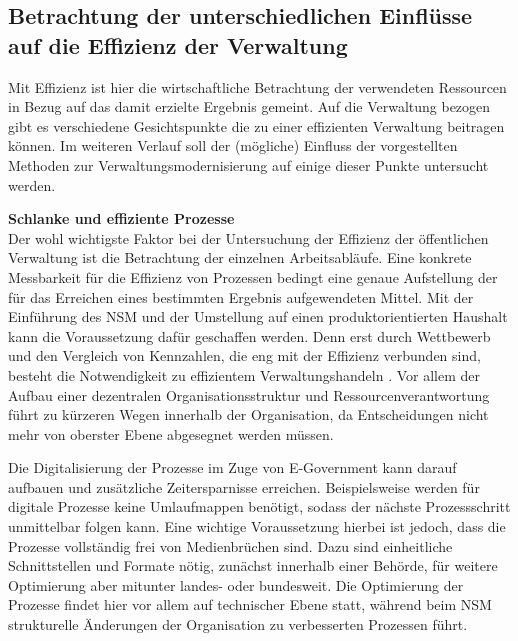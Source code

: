 \subsection{Betrachtung der unterschiedlichen Einflüsse auf die Effizienz der Verwaltung}
Mit Effizienz ist hier die wirtschaftliche Betrachtung der verwendeten Ressourcen in Bezug auf das damit erzielte Ergebnis gemeint.
Auf die Verwaltung bezogen gibt es verschiedene Gesichtspunkte die zu einer effizienten Verwaltung beitragen können.
Im weiteren Verlauf soll der (mögliche) Einfluss der vorgestellten Methoden zur Verwaltungsmodernisierung auf einige dieser Punkte untersucht werden.

\textbf{Schlanke und effiziente Prozesse}\\
Der wohl wichtigste Faktor bei der Untersuchung der Effizienz der öffentlichen Verwaltung ist die Betrachtung der einzelnen Arbeitsabläufe.
Eine konkrete Messbarkeit für die Effizienz von Prozessen bedingt eine genaue Aufstellung der für das Erreichen eines bestimmten Ergebnis aufgewendeten Mittel.
Mit der Einführung des NSM und der Umstellung auf einen produktorientierten Haushalt kann die Voraussetzung dafür geschaffen werden.
Denn erst durch Wettbewerb und den Vergleich von Kennzahlen, die eng mit der Effizienz verbunden sind, besteht die Notwendigkeit zu effizientem Verwaltungshandeln \cite[][]{Jann2019}.
Vor allem der Aufbau einer dezentralen Organisationsstruktur und Ressourcenverantwortung führt zu kürzeren Wegen innerhalb der Organisation, da Entscheidungen nicht mehr von oberster Ebene abgesegnet werden müssen.

Die Digitalisierung der Prozesse im Zuge von E-Government kann darauf aufbauen und zusätzliche Zeitersparnisse erreichen.
Beispielsweise werden für digitale Prozesse keine Umlaufmappen benötigt, sodass der nächste Prozessschritt unmittelbar folgen kann.
Eine wichtige Voraussetzung hierbei ist jedoch, dass die Prozesse vollständig frei von Medienbrüchen sind.
Dazu sind einheitliche Schnittstellen und Formate nötig, zunächst innerhalb einer Behörde, für weitere Optimierung aber mitunter landes- oder bundesweit.
Die Optimierung der Prozesse findet hier vor allem auf technischer Ebene statt, während beim NSM strukturelle Änderungen der Organisation zu verbesserten Prozessen führt.

